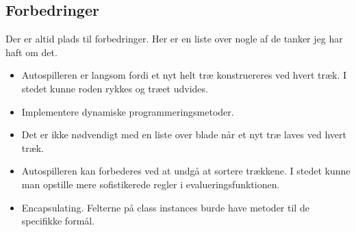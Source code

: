 \subsection{Forbedringer}
Der er altid plads til forbedringer. Her er en liste over nogle af de tanker jeg har haft om det.
\begin{itemize}
    \item Autospilleren er langsom fordi et nyt helt træ konstruereres ved hvert træk.
    I stedet kunne roden rykkes og træet udvides.
    \item Implementere dynamiske programmeringsmetoder.
    \item Det er ikke nødvendigt med en liste over blade når et nyt træ laves ved hvert træk.
    \item Autospilleren kan forbederes ved at undgå at sortere trækkene.
    I stedet kunne man opstille mere sofistikerede regler i evalueringsfunktionen.
    \item Encapsulating. Felterne på class instances burde have metoder til de specifikke formål.
\end{itemize}